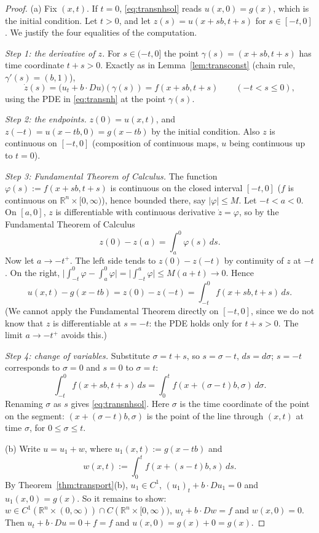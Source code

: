 \documentclass[11pt]{article}
\theoremstyle{plain}
\theoremstyle{definition}
\theoremstyle{remark}
\begin{document}
\begin{proof}
(a) Fix $(x,t)$. If $t = 0$, \eqref{eq:transnhsol} reads $u(x,0) = g(x)$, which is the initial condition. Let $t > 0$, and let $z(s) = u(x + sb, t + s)$ for $s \in [-t,0]$. We justify the four equalities of the computation.

\emph{Step 1: the derivative of $z$.} For $s \in (-t,0]$ the point $\gamma(s) = (x + sb, t + s)$ has time coordinate $t + s > 0$. Exactly as in Lemma~\ref{lem:transconst} (chain rule, $\gamma'(s) = (b,1)$),
$$ \dot z(s) = \big(u_t + b\cdot Du\big)(\gamma(s)) = f(x + sb, t + s) \qquad (-t < s \leq 0), $$
using the PDE in \eqref{eq:transnh} at the point $\gamma(s)$.

\emph{Step 2: the endpoints.} $z(0) = u(x,t)$, and $z(-t) = u(x - tb,0) = g(x - tb)$ by the initial condition. Also $z$ is continuous on $[-t,0]$ (composition of continuous maps, $u$ being continuous up to $t = 0$).

\emph{Step 3: Fundamental Theorem of Calculus.} The function $\varphi(s) := f(x + sb,t + s)$ is continuous on the closed interval $[-t,0]$ ($f$ is continuous on $\mathbb{R}^n \times [0,\infty)$), hence bounded there, say $|\varphi| \leq M$. Let $-t < a < 0$. On $[a,0]$, $z$ is differentiable with continuous derivative $\dot z = \varphi$, so by the Fundamental Theorem of Calculus
$$ z(0) - z(a) = \int_a^0 \varphi(s)\, ds. $$
Now let $a \to -t^+$. The left side tends to $z(0) - z(-t)$ by continuity of $z$ at $-t$. On the right, $\big|\int_{-t}^0\varphi - \int_a^0\varphi\big| = \big|\int_{-t}^a\varphi\big| \le M(a + t) \to 0$. Hence
$$ u(x,t) - g(x - tb) = z(0) - z(-t) = \int_{-t}^0 f(x + sb, t + s)\, ds. $$
(We cannot apply the Fundamental Theorem directly on $[-t,0]$, since we do not know that $z$ is differentiable at $s = -t$: the PDE holds only for $t + s > 0$. The limit $a \to -t^+$ avoids this.)

\emph{Step 4: change of variables.} Substitute $\sigma = t + s$, so $s = \sigma - t$, $ds = d\sigma$; $s = -t$ corresponds to $\sigma = 0$ and $s = 0$ to $\sigma = t$:
$$ \int_{-t}^0 f(x + sb, t + s)\, ds = \int_0^t f(x + (\sigma - t)b, \sigma)\, d\sigma. $$
Renaming $\sigma$ as $s$ gives \eqref{eq:transnhsol}. Here $\sigma$ is the time coordinate of the point on the segment: $(x + (\sigma - t)b, \sigma)$ is the point of the line through $(x,t)$ at time $\sigma$, for $0 \le \sigma \le t$.

(b) Write $u = u_1 + w$, where $u_1(x,t) := g(x - tb)$ and
$$ w(x,t) := \int_0^t f(x + (s - t)b, s)\, ds. $$
By Theorem~\ref{thm:transport}(b), $u_1 \in C^1$, $(u_1)_t + b\cdot Du_1 = 0$ and $u_1(x,0) = g(x)$. So it remains to show: $w \in C^1(\mathbb{R}^n \times (0,\infty)) \cap C(\mathbb{R}^n \times [0,\infty))$, $w_t + b\cdot Dw = f$ and $w(x,0) = 0$. Then $u_t + b\cdot Du = 0 + f = f$ and $u(x,0) = g(x) + 0 = g(x)$.


\end{proof}
\end{document}
